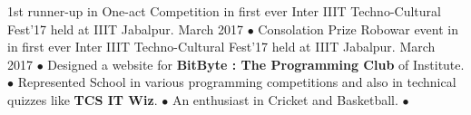\begin{cvhonors}
  
  \cvhonor
    {\small 1st  runner-up }
    {\small in One-act Competition in first ever Inter IIIT Techno-Cultural Fest’17 held at IIIT Jabalpur.}
    {\small March 2017}
    {$\bullet$}
  \cvhonor
    {\small Consolation Prize }
    {\small Robowar event in in first ever Inter IIIT Techno-Cultural Fest’17 held at IIIT Jabalpur.}
    {\small March 2017}
    {$\bullet$}
  \cvhonor
    {}
    {\small Designed a website for \textbf{BitByte : The Programming Club} of Institute.}
    {}
    {$\bullet$}
  \cvhonor
    {}
    {\small Represented School in various programming competitions and also in technical quizzes like \textbf{TCS IT Wiz}.}
    {}
    {$\bullet$}
  \cvhonor
    {}
    {\small An enthusiast in Cricket and Basketball.}
    {}
    {$\bullet$}
\end{cvhonors}
